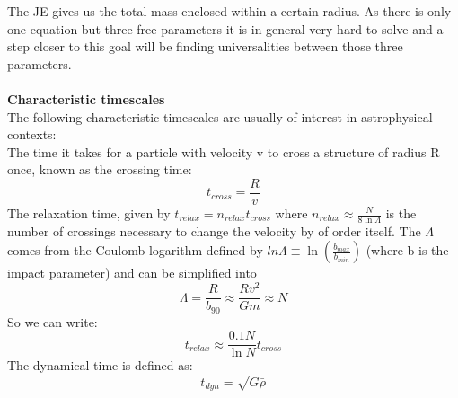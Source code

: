 The JE gives us the total mass enclosed within a certain radius. As there is only one equation but three free parameters it is in general very hard to solve and a step closer to this goal will be finding universalities between those three parameters. \\ \\
\textbf{Characteristic timescales} \\
The following characteristic timescales are usually of interest in astrophysical contexts: \\
The time it takes for a particle with velocity v to cross a structure of radius R once, known as the crossing time: 
\begin{equation}
t_{cross} = \frac{R}{v}
\end{equation}
The relaxation time, given by $ t_{relax} = n_{relax}t_{cross} $ where $ n_{relax} \approx \frac{N}{8\ln\Lambda} $ is the number of crossings necessary to change the velocity by of order itself.
The $\Lambda$ comes from the Coulomb logarithm defined by $ ln\Lambda \equiv \ln(\frac{b_{max}}{b_{min}})$ (where b is the impact parameter) and can be simplified into 
\begin{equation}
\Lambda = \frac{R}{b_{90}} \approx \frac{Rv^2}{Gm} \approx N 
\end{equation}
So we can write: 
\begin{equation}
t_{relax} \approx \frac{0.1N}{\ln N}t_{cross} 
\end{equation}
The dynamical time is defined as: 
\begin{equation}
t_{dyn} = \sqrt{G \bar{\rho}}  
\end{equation}

